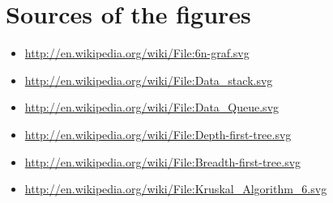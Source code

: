 \section{Sources of the figures}

\begin{itemize}
    \item \url{http://en.wikipedia.org/wiki/File:6n-graf.svg}
    \item \url{http://en.wikipedia.org/wiki/File:Data_stack.svg}
    \item \url{http://en.wikipedia.org/wiki/File:Data_Queue.svg}
    \item \url{http://en.wikipedia.org/wiki/File:Depth-first-tree.svg}
    \item \url{http://en.wikipedia.org/wiki/File:Breadth-first-tree.svg}
    \item \url{http://en.wikipedia.org/wiki/File:Kruskal_Algorithm_6.svg}
\end{itemize}
